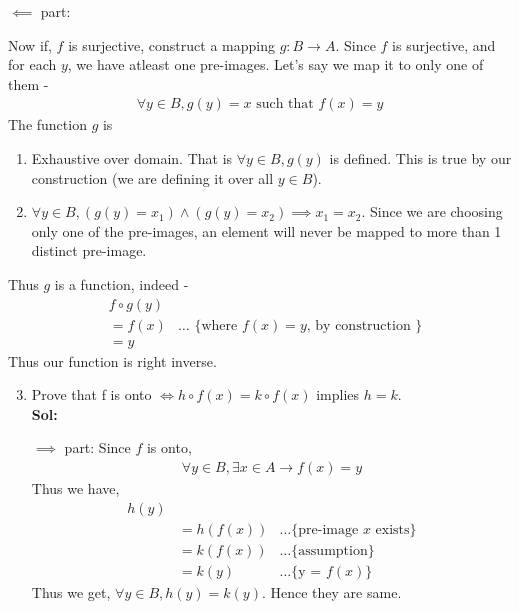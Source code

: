 \documentclass[xcolor=svgnames]{beamer}
\begin{document}
\begin{frame}{}
\footnotesize{$\impliedby$ part:

Now if, $f$ is surjective, construct a mapping $g:B \rightarrow A$. Since $f$ is surjective, and for each $y$, we have atleast one pre-images. Let's say we map it to only one of them -
\begin{align*}
 \forall y \in B, g(y) = x \text{ such that } f(x) = y 
\end{align*}
  The function $g$ is 
  \begin{enumerate}
      \item Exhaustive over domain. That is $\forall y \in B, g(y)$ is defined. This is true by our construction (we are defining it over all $y \in B$).
        \item $\forall y \in B, (g(y) = x_1) \land (g(y) = x_2) \implies x_1 = x_2$. Since we are choosing only one of the pre-images, an element will never be mapped to more than 1 distinct pre-image.
  \end{enumerate}
Thus $g$ is a function, indeed - 
\begin{align*}
    & f \circ g(y) &
    \\ &= f (x) & \ldots \text{ \{ where $f(x) = y$, by construction \}}
    \\ &= y
\end{align*}
Thus our function is right inverse.
}
\end{frame}
\begin{frame}{}
    \begin{enumerate}\setcounter{enumi}{2}
    \item Prove that f is onto $\iff h \circ f(x) = k \circ f(x) $ implies $h=k$. 
    \\ \textbf{Sol:} 
    
    $\implies$ part:
    Since $f$ is onto, 
    \begin{align*}
        \forall y \in B, \exists x \in A \rightarrow f(x) = y
    \end{align*}
    Thus we have, 
    \begin{align*}
        h(y) & &
        \\ &= h(f(x)) & \ldots \text{\{ pre-image $x$ exists\}}
        \\ &= k(f(x)) & \ldots \text{\{ assumption\}}
        \\ &= k(y)& \ldots \text{\{ y = $f(x)$\}}
    \end{align*}
    Thus we get, $\forall y \in B, h(y) = k(y)$. Hence they are same.
\end{enumerate}

\end{frame}
\end{document}
